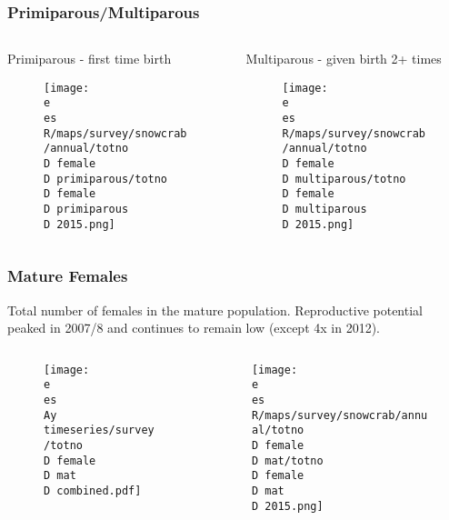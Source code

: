 \begin{frame}
\frametitle{Primiparous/Multiparous}
\begin{columns}
	\begin{column}{0.5\textwidth}
	\begin{center}
	Primiparous - first time birth
	\end{center}
		\begin{figure}
		\texttt{[image: \\e \\es R/maps/survey/snowcrab/annual/totno\\D female\\D primiparous/totno\\D female\\D primiparous\\D 2015.png]}
	\end{figure}
	\end{column}

	\begin{column}{0.5\textwidth}
	\begin{center}
	Multiparous - given birth 2+ times
	\end{center}
	\begin{figure}
		\texttt{[image: \\e \\es R/maps/survey/snowcrab/annual/totno\\D female\\D multiparous/totno\\D female\\D multiparous\\D 2015.png]}	
	\end{figure}
	\end{column}
	\end{columns}
\end{frame}

\begin{frame}
\frametitle{Mature Females}
	\begin{center}
	Total number of females in the mature population. Reproductive potential peaked in 2007/8 and continues to remain low (except 4x in 2012).
	\end{center}
	
	\begin{columns}
	\begin{column}{0.5\textwidth}
	\begin{figure}
	  \texttt{[image: \\e \\es \\Ay timeseries/survey/totno\\D female\\D mat\\D combined.pdf]}
	\end{figure}
	\end{column}

	\begin{column}{0.5\textwidth}
	\begin{figure}
	\texttt{[image: \\e \\es R/maps/survey/snowcrab/annual/totno\\D female\\D mat/totno\\D female\\D mat\\D 2015.png]}	
	\end{figure}
	\end{column}
	\end{columns}
\end{frame}

